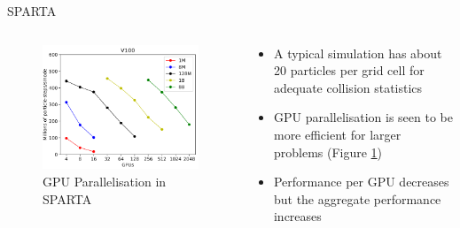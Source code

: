 \documentclass{beamer}
\begin{document}
        \begin{frame}{SPARTA}
            \begin{columns}
                \begin{column}{0.5\linewidth}
                    \begin{figure}
                        \centering
                        \includegraphics[width=\linewidth]{Pictures/Literature/GPU.png}
                        \caption{GPU Parallelisation in SPARTA}
                        \label{gra:GPU}
                    \end{figure}
                \end{column}
        
                \begin{column}{0.5\linewidth}
                    \begin{itemize}
                        \setlength\itemsep{0.25cm}
                        
                        \item<1-> A typical simulation has about 20 particles per grid cell for adequate collision statistics
    
                        \item<2-> GPU parallelisation is seen to be more efficient for larger problems (Figure \ref{gra:GPU})
                        
                        \item<3-> Performance per GPU decreases but the aggregate performance increases
                    \end{itemize}
                \end{column}
            \end{columns}
        \end{frame}
\end{document}
